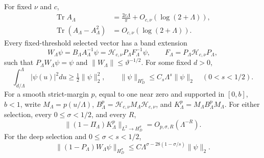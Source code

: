 \begin{proposition}\label{hnew:geometry}
For fixed $\nu$ and $c$,
\begin{align}
 \operatorname{Tr}A_\Lambda
    &=\frac{2c\Lambda}{\pi}+O_{c,\nu}(\log(2+\Lambda)),\label{hnew:trace}\\
 \operatorname{Tr}(A_\Lambda-A_\Lambda^2)
    &=O_{c,\nu}(\log(2+\Lambda)).\label{hnew:variance}
\end{align}
Every fixed-threshold selected vector has a band extension
\[
 W_\Lambda\psi
 =B_\Lambda A_\Lambda^{-1}\psi
 =\mathcal H_{c,\nu}P_\Lambda F_\Lambda^{-1}\psi,\qquad
 F_\Lambda=P_\Lambda\mathcal H_{c,\nu}P_\Lambda,
\]
such that $P_\Lambda W_\Lambda\psi=\psi$ and
$\|W_\Lambda\|\le\vartheta^{-1/2}$.  For some fixed $d>0$,
\begin{equation}\label{hnew:raw-mass-graph}
 \int_{d/\Lambda}^\Lambda|\psi(u)|^2du
   \ge\tfrac12\|\psi\|_2^2,\qquad
 \|\psi\|_{H_D^s}\le C_s\Lambda^s\|\psi\|_2
       \quad(0<s<1/2).
\end{equation}
For a smooth strict-margin $p$, equal to one near zero and supported
in $[0,b]$, $b<1$, write
$M_\Lambda=p(u/\Lambda)$,
$B_\Lambda^p=\mathcal H_{c,\nu}M_\Lambda\mathcal H_{c,\nu}$, and
$K_\Lambda^p=M_\Lambda B_\Lambda^pM_\Lambda$.  For either selection,
every $0\le\sigma<1/2$, and every $R$,
\begin{equation}\label{hnew:interior}
 \|(1-\Pi_\Lambda)K_\Lambda^p\|_{L^2\to H_D^\sigma}
                  =O_{p,\sigma,R}(\Lambda^{-R}).
\end{equation}
For the deep selection and $0\le\sigma<s<1/2$,
\begin{equation}\label{hnew:deep-raw-tail}
 \|(1-P_\Lambda)W_\Lambda\psi\|_{H_D^\sigma}
 \le C\Lambda^{\sigma-28(1-\sigma/s)}\|\psi\|_2.
\end{equation}
\end{proposition}
